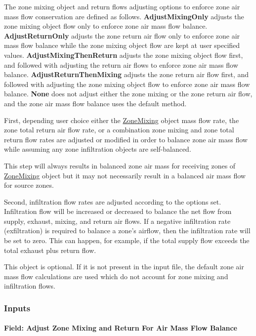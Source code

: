 The zone mixing object and return flows adjusting options to enforce zone air mass flow conservation are defined as follows. \textbf{AdjustMixingOnly} adjusts the zone mixing object flow only to enforce zone air mass flow balance. \textbf{AdjustReturnOnly} adjusts the zone return air flow only to enforce zone air mass flow balance while the zone mixing object flow are kept at user specified values. \textbf{AdjustMixingThenReturn} adjusts the zone mixing object flow first, and followed with adjusting the return air flows to enforce zone air mass flow balance. \textbf{AdjustReturnThenMixing} adjusts the zone return air flow first, and followed with adjusting the zone mixing object flow to enforce zone air mass flow balance. \textbf{None} does not adjust either the zone mixing or the zone return air flow, and the zone air mass flow balance uses the default method.

First, depending user choice either the \hyperref[zonemixing]{ZoneMixing} object mass flow rate, the zone total return air flow rate, or a combination zone mixing and zone total return flow rates are adjusted or modified in order to balance zone air mass flow while assuming any zone infiltration objects are self-balanced.

This step will always results in balanced zone air mass for receiving zones of \hyperref[zonemixing]{ZoneMixing} object but it may not necessarily result in a balanced air mass flow for source zones.~

Second, infiltration flow rates are adjusted according to the options set. Infiltration flow will be increased or decreased to balance the net flow from supply, exhaust, mixing, and return air flows. If a negative infiltration rate (exfiltration) is required to balance a zone's airflow, then the infiltration rate will be set to zero. This can happen, for example, if the total supply flow exceeds the total exhaust plus return flow.

This object is optional. If it is not present in the input file, the default zone air mass flow calculations are used which do not account for zone mixing and infiltration flows.

\subsubsection{Inputs}\label{inputs-9-002}

\paragraph{Field: Adjust Zone Mixing and Return For Air Mass Flow Balance}\label{field-adjust-zone-mixing-and-return-for-air-mass-flow-balance}

